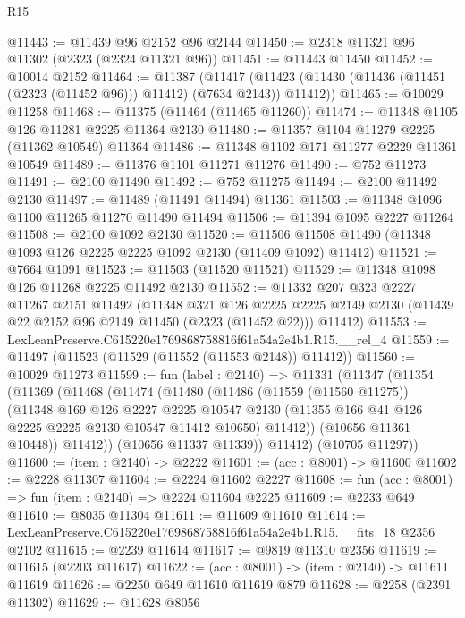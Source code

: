 \begin{lexlean}{R15}
\begin{coremodule}
@11443 := @11439 @96 @2152 @96 @2144
@11450 := @2318 @11321 @96 @11302 (@2323 (@2324 @11321 @96))
@11451 := @11443 @11450
@11452 := @10014 @2152
@11464 := @11387
    (@11417 (@11423 (@11430 (@11436 (@11451 (@2323 (@11452 @96))) @11412) (@7634 @2143)) @11412))
@11465 := @10029 @11258
@11468 := @11375 (@11464 (@11465 @11260))
@11474 := @11348 @1105 @126 @11281 @2225 @11364 @2130
@11480 := @11357 @1104 @11279 @2225 (@11362 @10549) @11364
@11486 := @11348 @1102 @171 @11277 @2229 @11361 @10549
@11489 := @11376 @1101 @11271 @11276
@11490 := @752 @11273
@11491 := @2100 @11490
@11492 := @752 @11275
@11494 := @2100 @11492 @2130
@11497 := @11489 (@11491 @11494) @11361
@11503 := @11348 @1096 @1100 @11265 @11270 @11490 @11494
@11506 := @11394 @1095 @2227 @11264
@11508 := @2100 @1092 @2130
@11520 := @11506 @11508 @11490 (@11348 @1093 @126 @2225 @2225 @1092 @2130 (@11409 @1092) @11412)
@11521 := @7664 @1091
@11523 := @11503 (@11520 @11521)
@11529 := @11348 @1098 @126 @11268 @2225 @11492 @2130
@11552 := @11332
    @207
    @323
    @2227
    @11267
    @2151
    @11492
    (@11348
      @321
      @126
      @2225
      @2225
      @2149
      @2130
      (@11439 @22 @2152 @96 @2149 @11450 (@2323 (@11452 @22)))
      @11412)
@11553 := LexLeanPreserve.C615220e1769868758816f61a54a2e4b1.R15.__rel_4
@11559 := @11497 (@11523 (@11529 (@11552 (@11553 @2148)) @11412))
@11560 := @10029 @11273
@11599 := fun (label : @2140) =>
  @11331
    (@11347
      (@11354
        (@11369
          (@11468
            (@11474
              (@11480
                (@11486
                  (@11559 (@11560 @11275))
                  (@11348
                    @169
                    @126
                    @2227
                    @2225
                    @10547
                    @2130
                    (@11355 @166 @41 @126 @2225 @2225 @2130 @10547 @11412 @10650)
                    @11412))
                (@10656 @11361 @10448))
              @11412))
          (@10656 @11337 @11339))
        @11412)
      (@10705 @11297))
@11600 := (item : @2140) -> @2222
@11601 := (acc : @8001) -> @11600
@11602 := @2228 @11307
@11604 := @2224 @11602 @2227
@11608 := fun (acc : @8001) => fun (item : @2140) => @2224 @11604 @2225
@11609 := @2233 @649
@11610 := @8035 @11304
@11611 := @11609 @11610
@11614 := LexLeanPreserve.C615220e1769868758816f61a54a2e4b1.R15.__fits_18 @2356 @2102
@11615 := @2239 @11614
@11617 := @9819 @11310 @2356
@11619 := @11615 (@2203 @11617)
@11622 := (acc : @8001) -> (item : @2140) -> @11611 @11619
@11626 := @2250 @649 @11610 @11619 @879
@11628 := @2258 (@2391 @11302)
@11629 := @11628 @8056

\end{coremodule}
\end{lexlean}
